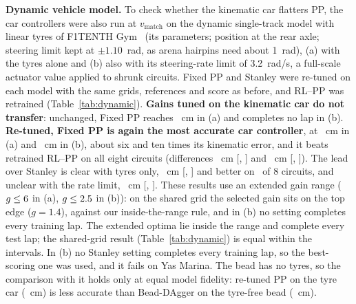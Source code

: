 \documentclass{IJCAS}
\begin{document}
\textbf{Dynamic vehicle model.} To check whether the kinematic car flatters PP, the car controllers were also run at $v_{\mathrm{match}}$ on the dynamic single-track model with linear tyres of F1TENTH Gym~\cite{okelly2020} (its parameters; position at the rear axle; steering limit kept at $\pm1.10$~rad, as arena hairpins need about 1~rad), (a) with the tyres alone and (b) also with its steering-rate limit of 3.2~rad/s, a full-scale actuator value applied to shrunk circuits. Fixed PP and Stanley were re-tuned on each model with the same grids, references and score as before, and RL--PP was retrained (Table~\ref{tab:dynamic}). \textbf{Gains tuned on the kinematic car do not transfer}: unchanged, Fixed PP reaches \VrmseDtFix~cm in (a) and completes no lap in (b). \textbf{Re-tuned, Fixed PP is again the most accurate car controller}, at \VrmseDtFixH~cm in (a) and \VrmseDrFixH~cm in (b), about six and ten times its kinematic error, and it beats retrained RL--PP on all eight circuits (differences \VdynDtFixRLDiff~cm [\VdynDtFixRLLo, \VdynDtFixRLHi] and \VdynDrFixRLDiff~cm [\VdynDrFixRLLo, \VdynDrFixRLHi]). The lead over Stanley is clear with tyres only, \VdynDtFixStDiff~cm [\VdynDtFixStLo, \VdynDtFixStHi] and better on \VdynDtFixStBetter\ of 8 circuits, and unclear with the rate limit, \VdynDrFixStDiff~cm [\VdynDrFixStLo, \VdynDrFixStHi]. These results use an extended gain range ($g\le6$ in (a), $g\le2.5$ in (b)): on the shared grid the selected gain sits on the top edge ($g=1.4$), against our inside-the-range rule, and in (b) no setting completes every training lap. The extended optima lie inside the range and complete every test lap; the shared-grid result (Table~\ref{tab:dynamic}) is equal within the intervals. In (b) no Stanley setting completes every training lap, so the best-scoring one was used, and it fails on Yas Marina. The bead has no tyres, so the comparison with it holds only at equal model fidelity: re-tuned PP on the tyre car (\VrmseDtFixH~cm) is less accurate than Bead-DAgger on the tyre-free bead (\VrmseDagger~cm).

\begin{table}[t]
\caption{Eight test circuits at $v_{\mathrm{match}}$ on the dynamic single-track car: (a) tyres only, (b) tyres and steering-rate limit. Settings: $(L_d,g)$ or $(k,k_s)$. RMSE in cm against the extracted reference (Extr.) and the true centerline (True); Laps: \% completed.}\label{tab:dynamic}
\centering
{}
\end{table}
\end{document}
